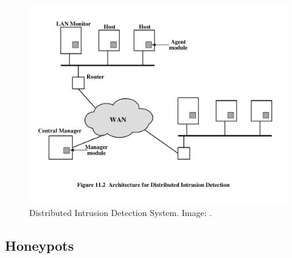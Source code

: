 \begin{frame}
  \begin{figure}
    \includegraphics[height=0.7\textheight]{figs/dids.pdf}
    \caption{Distributed Intrusion Detection System.
      Image: \cite{Stallings2013nse}.}
  \end{figure}
\end{frame}

\subsection{Honeypots}

